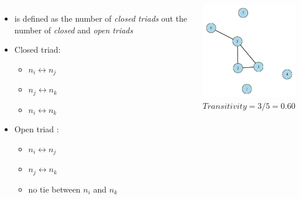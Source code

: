 \documentclass[8pt]{beamer}
\begin{document}
\begin{frame}
\frametitle{\insertsection}
\framesubtitle{\insertsubsection}

\begin{columns}
\begin{itemize}
\item {\color{blue}{Transitivity}} is defined as the number of \textit{closed triads} out the number of \textit{closed} and \textit{open triads}
\item Closed triad: 
    \begin{itemize}
    \item $n_i \leftrightarrow n_j$
    \item $n_j \leftrightarrow n_k$
    \item $n_i \leftrightarrow n_k$
    \end{itemize}
    
\item Open triad : 
    \begin{itemize}
    \item $n_i \leftrightarrow n_j$
    \item $n_j \leftrightarrow n_k$
    \item no tie between $n_i$ and $n_k$
    \end{itemize}
\end{itemize}

\centering
\includegraphics[width=5cm]{reachability}\\
$Transitivity = 3/5 = 0.60$

\end{columns}

\end{frame}

\end{document}
